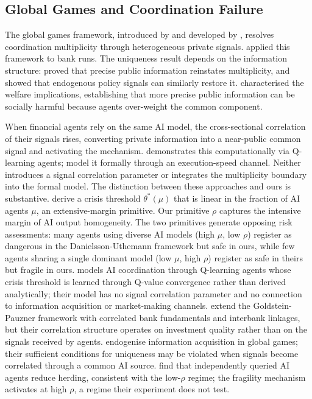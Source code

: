 \label{sec:literature}

\subsection{Global Games and Coordination Failure}

The global games framework, introduced by \citet{carlsson1993} and developed by \citet{morris1998, morris2002}, resolves coordination multiplicity through heterogeneous private signals. \citet{goldstein2005} applied this framework to bank runs. The uniqueness result depends on the information structure: \citet{hellwig2002} proved that precise public information reinstates multiplicity, and \citet{angeletos2006} showed that endogenous policy signals can similarly restore it. \citet{angeletos2007} characterised the welfare implications, establishing that more precise public information can be socially harmful because agents over-weight the common component.

When financial agents rely on the same AI model, the cross-sectional correlation of their signals rises, converting private information into a near-public common signal and activating the \citet{hellwig2002} mechanism. \citet{yang2024} demonstrates this computationally via Q-learning agents; \citet{danielsson2025} model it formally through an execution-speed channel. Neither introduces a signal correlation parameter or integrates the \citet{hellwig2002} multiplicity boundary into the formal model. The distinction between these approaches and ours is substantive. \citet{danielsson2025} derive a crisis threshold $\theta^*(\mu)$ that is linear in the fraction of AI agents $\mu$, an extensive-margin primitive. Our primitive $\rho$ captures the intensive margin of AI output homogeneity. The two primitives generate opposing risk assessments: many agents using diverse AI models (high $\mu$, low $\rho$) register as dangerous in the Danielsson-Uthemann framework but safe in ours, while few agents sharing a single dominant model (low $\mu$, high $\rho$) register as safe in theirs but fragile in ours. \citet{yang2024} models AI coordination through Q-learning agents whose crisis threshold is learned through Q-value convergence rather than derived analytically; their model has no signal correlation parameter and no connection to information acquisition or market-making channels. \citet{margaretic2014} extend the Goldstein-Pauzner framework with correlated bank fundamentals and interbank linkages, but their correlation structure operates on investment quality rather than on the signals received by agents. \citet{szkup2015} endogenise information acquisition in global games; their sufficient conditions for uniqueness may be violated when signals become correlated through a common AI source. \citet{hansen2025} find that independently queried AI agents reduce herding, consistent with the low-$\rho$ regime; the fragility mechanism activates at high $\rho$, a regime their experiment does not test.

